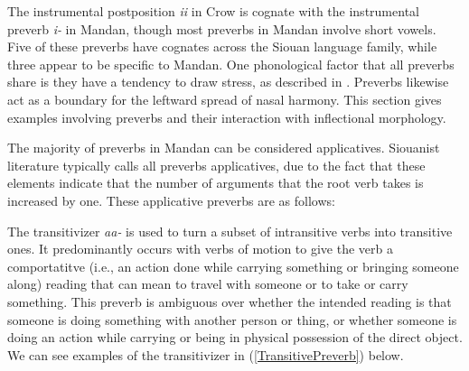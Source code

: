 The instrumental postposition \textit{ii} in Crow is cognate with the instrumental preverb \textit{i-} in Mandan, though most preverbs in Mandan involve short vowels. Five of these preverbs have cognates across the Siouan language family, while three appear to be specific to Mandan. One phonological factor that all preverbs share is they have a tendency to draw stress, as described in . Preverbs likewise act as a boundary for the leftward spread of nasal harmony. This section gives examples involving preverbs and their interaction with inflectional morphology.

\label{ParaApplicatives}

The majority of preverbs in Mandan can be considered applicatives. Siouanist literature typically calls all preverbs applicatives, due to the fact that these elements indicate that the number of arguments that the root verb takes is increased by one. These applicative preverbs are as follows:

\label{SubParaTransitivizer}

The transitivizer \textit{aa-} is used to turn a subset of intransitive verbs into transitive ones. It predominantly occurs with verbs of motion to give the verb a comportatitve (i.e., an action done while carrying something or bringing someone along) reading that can mean to travel with someone or to take or carry something. This preverb is ambiguous over whether the intended reading is that someone is doing something with another person or thing, or whether someone is doing an action while carrying or being in physical possession of the direct object. We can see examples of the transitivizer in (\ref{TransitivePreverb}) below.

